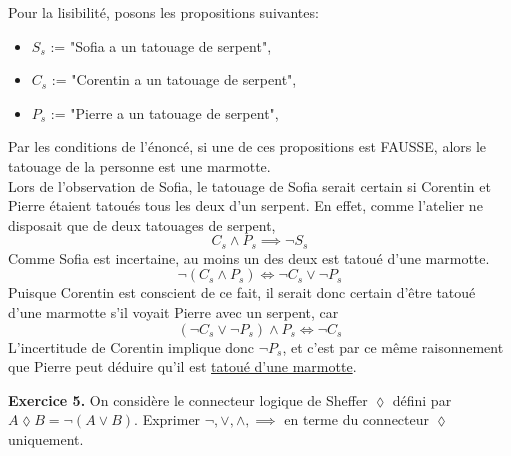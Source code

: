 \documentclass[a4paper, 10pt]{report}
\begin{document}
	\colorbox{solution}
	{
		\begin{minipage}{0.9\textwidth}
			Pour la lisibilité, posons les propositions suivantes:
			\begin{itemize}[label=]
				\item $S_s$ := "Sofia a un tatouage de serpent",
				\item $C_s$ := "Corentin a un tatouage de serpent",
				\item $P_s$ := "Pierre a un tatouage de serpent",
			\end{itemize}
			Par les conditions de l'énoncé, si une de ces propositions est FAUSSE, alors le tatouage de la personne est une marmotte.\\
			
			Lors de l'observation de Sofia, le tatouage de Sofia serait certain si Corentin et Pierre étaient tatoués tous les deux d'un serpent. En effet, comme l'atelier ne disposait que de	deux tatouages de serpent,
			\[C_s \land P_s \implies \lnot S_s\]
			Comme Sofia est incertaine, au moins un des deux est tatoué d'une marmotte.
			\[\lnot(C_s \land P_s) \iff \lnot C_s \lor \lnot P_s\]
			Puisque Corentin est conscient de ce fait, il serait donc certain d'être tatoué d'une marmotte s'il voyait Pierre avec un serpent, car
			\[(\lnot C_s \lor \lnot P_s) \land P_s \iff \lnot C_s\]
			L'incertitude de Corentin implique donc $\lnot P_s$, et c'est par	ce même raisonnement que Pierre peut déduire qu'il est \underline{tatoué d'une marmotte}.
		\end{minipage}
	}
	
	\vspace{5mm}
	\noindent
	{\color{red}\textbf{Exercice 5.}}
	On considère le connecteur logique de Sheffer $\lozenge$ défini par\\
	$A \lozenge B = \lnot (A \lor B)$.
	Exprimer $\lnot, \lor, \land, \implies$ en terme du connecteur
	$\lozenge$ uniquement.
	
\end{document}

